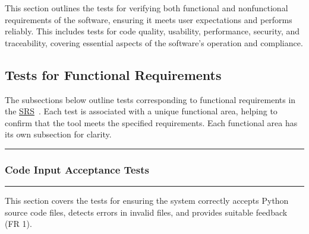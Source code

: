 \documentclass[12pt, titlepage]{article}
\newcommand{\SRS}{\href{https://github.com/ssm-lab/capstone--source-code-optimizer/blob/main/docs/SRS/SRS.pdf}{SRS}}
\newcommand{\colorrule}{\textcolor{BlueViolet}{\rule{\linewidth}{2pt}}}
\begin{document}
This section outlines the tests for verifying both functional and nonfunctional requirements of the software, ensuring it meets user expectations and performs reliably. This includes tests for code quality, usability, performance, security, and traceability, covering essential aspects of the software’s operation and compliance.

\subsection{Tests for Functional Requirements}

The subsections below outline tests corresponding to functional 
requirements in the \SRS~\cite{SRS}. Each test is associated with a unique functional area, helping to confirm that the tool meets the specified requirements. Each functional area has its own subsection for clarity.

\noindent
\colorrule

\subsubsection{Code Input Acceptance Tests}
\colorrule

\medskip

\noindent
This section covers the tests for ensuring the system correctly accepts Python source code files, detects errors in invalid files, and provides suitable feedback (FR 1).
\end{document}
